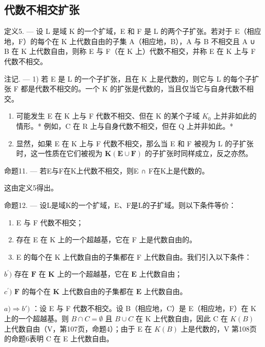 \subsection{代数不相交扩张}

定义5. --- 设 L 是域 K 的一个扩域，E 和 F 是 L 的两个子扩张。若对于 E（相应地，F）的每个在 K 上代数自由的子集 A（相应地，B），A 与 B 不相交且 A ∪ B 在 K 上代数自由，则称 E 与 F（在 K 上）代数不相交，并称 E 在 K 上与 F 代数不相交。

注记. --- 1) 若 E 是 L 的一个子扩张，且在 K 上是代数的，则它与 L 的每个子扩张 F 都是代数不相交的。一个 K 的扩张是代数的，当且仅当它与自身代数不相交。

\begin{enumerate}
\def\labelenumi{\arabic{enumi})}
\setcounter{enumi}{1}
\item
  可能发生 E 在 K 上与 F 代数不相交、但在 K 的某个子域 \(K_{0}\) 上并非如此的情形。* 例如，C 在 R 上与自身代数不相交，但在 Q 上并非如此。*
\item
  显然，如果 E 在 K 上与 F 代数不相交，那么当 E 和 F 被视为 L 的子扩张时，这一性质在它们被视为 \(\mathbf{K}(\mathbf{E} \cup \mathbf{F})\) 的子扩张时同样成立，反之亦然。
\end{enumerate}

命题11. --- 若E与F在K上代数不相交，则E ∩ F在K上是代数的。

这由定义5得出。

命题12. --- 设L是域K的一个扩域，E、F是L的子扩域。则以下条件等价：

\begin{enumerate}
\def\labelenumi{\alph{enumi})}
\item
  E 与 F 代数不相交；
\item
  存在 E 在 K 上的一个超越基，它在 F 上是代数自由的。
\item
  E 的每个在 K 上代数自由的子集都在 F 上代数自由。我们引入以下条件：
\end{enumerate}

\(b^{\prime})\) 存在 \(\mathbf{F}\) 在 \(\mathbf{K}\) 上的一个超越基，它在 \(\mathbf{E}\) 上代数自由；

\(c^{\prime})\) \(\mathbf{F}\) 的每个在 \(\mathbf{K}\) 上代数自由的子集都在 \(\mathbf{E}\) 上代数自由。

\(a) \Rightarrow b')\) ：设 E 与 F 代数不相交。设 B（相应地，C）是 E（相应地，F）在 K 上的一个超越基。则 \(B \cap C = \emptyset\) 且 \(B \cup C\) 在 K 上代数自由，因此 C 在 \(K(B)\) 上代数自由（V，第107页，命题4）；由于 E 在 \(K(B)\) 上是代数的，V 第108页的命题6表明 C 在 E 上代数自由。


